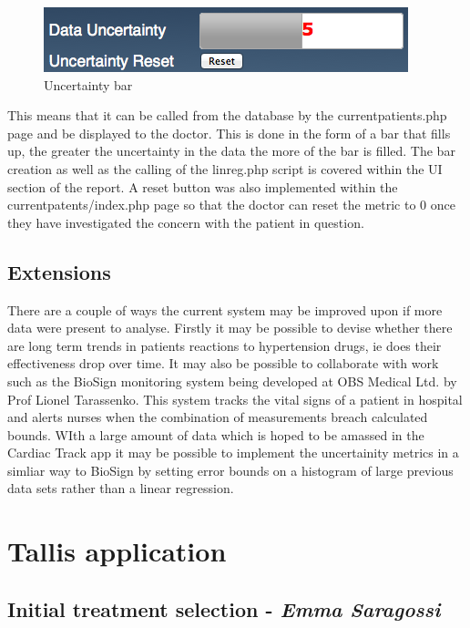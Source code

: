 \documentclass[11pt]{article}
\begin{document}
\begin{figure}
\centering
\includegraphics[scale=0.35]{unbar.png}
\caption{Uncertainty bar} 
\end{figure} 
This means that it can be called from the database by the currentpatients.php page and be displayed to the doctor. This is done in the form of a bar that fills up, the greater the uncertainty in the data the more of the bar is filled. The bar creation as well as the calling of the linreg.php script is covered within the UI section of the report. A reset button was also implemented within the currentpatents/index.php page so that the doctor can reset the metric to 0 once they have investigated the concern with the patient in question. 

\subsection{Extensions}
There are a couple of ways the current system may be improved upon if more data were present to analyse. Firstly it may be possible to devise whether there are long term trends in patients reactions to hypertension drugs, ie does their effectiveness drop over time. It may also be possible to collaborate with work such as the BioSign monitoring system being developed at OBS Medical Ltd.\cite{OBS} by Prof Lionel Tarassenko. This system tracks the vital signs of a patient in hospital and alerts nurses when the combination of measurements breach calculated bounds. WIth a large amount of data which is hoped to be amassed in the Cardiac Track app it may be possible to implement the uncertainity metrics in a simliar way to BioSign by setting error bounds on a histogram of large previous data sets rather than a linear regression. 


\section{Tallis application}

\subsection{Initial treatment selection - \textit{Emma Saragossi}}
\label{sec:Treatment}
\end{document}

